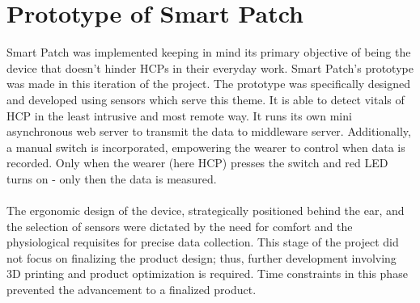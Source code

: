 


\section{Prototype of Smart Patch}
Smart Patch was implemented keeping in mind its primary objective of being the device that doesn't hinder HCPs in their everyday work. Smart Patch's prototype was made in this iteration of the project. The prototype was specifically designed and developed using sensors which serve this theme. It is able to detect vitals of HCP in the least intrusive and most remote way. It runs its own mini asynchronous web server to transmit the data to middleware server. Additionally, a manual switch is incorporated, empowering the wearer to control when data is recorded. Only when the wearer (here HCP) presses the switch and red LED turns on - only then the data is measured. \\ \\
The ergonomic design of the device, strategically positioned behind the ear, and the selection of sensors were dictated by the need for comfort and the physiological requisites for precise data collection. This stage of the project did not focus on finalizing the product design; thus, further development involving 3D printing and product optimization is required. Time constraints in this phase prevented the advancement to a finalized product.



